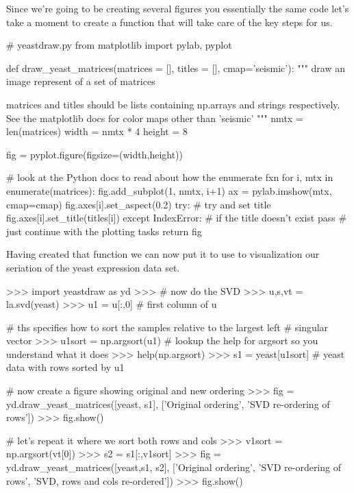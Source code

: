 Since we're going to be creating several figures you essentially the same code let's take a moment to create a function that will take care of the key steps for us.

\begin{codeblock}[python]
# yeastdraw.py
from matplotlib import pylab, pyplot

def draw_yeast_matrices(matrices = [], titles = [], cmap='seismic'):
    """ draw an image represent of a set of matrices
    
    matrices and titles should be lists containing np.arrays and strings
    respectively. See the matplotlib docs for color maps other than 'seismic'
    """
    nmtx = len(matrices)
    width = nmtx * 4
    height = 8
    
    fig = pyplot.figure(figsize=(width,height))
    
    # look at the Python docs to read about how the enumerate fxn
    for i, mtx in enumerate(matrices):
        fig.add_subplot(1, nmtx, i+1)
        ax = pylab.imshow(mtx, cmap=cmap)
        fig.axes[i].set_aspect(0.2)
        try:  # try and set title
            fig.axes[i].set_title(titles[i])
        except IndexError:  # if the title doesn't exist
            pass            # just continue with the plotting tasks
    return fig
    
\end{codeblock}

Having created that function we can now put it to use to visualization our seriation of the yeast expression data set.


\begin{python}
>>> import yeastdraw as yd    
>>> # now do the SVD   
>>> u,s,vt = la.svd(yeast)
>>> u1 = u[:,0] # first column of u

# ths specifies how to sort the samples relative to the largest left 
# singular vector
>>> u1sort = np.argsort(u1) 
# lookup the help for argsort so you understand what it does
>>> help(np.argsort)  
>>> s1 = yeast[u1sort] # yeast data with rows sorted by u1

# now create a figure showing original and new ordering
>>> fig = yd.draw_yeast_matrices([yeast, s1],
            ['Original ordering', 'SVD re-ordering of rows'])
>>> fig.show()

# let's repeat it where we sort both rows and cols
>>> v1sort = np.argsort(vt[0])
>>> s2 = s1[:,v1sort]
>>> fig = yd.draw_yeast_matrices([yeast,s1, s2],
        ['Original ordering', 'SVD re-ordering of rows',
        'SVD, rows and cols re-ordered'])
>>> fig.show()
\end{python}

